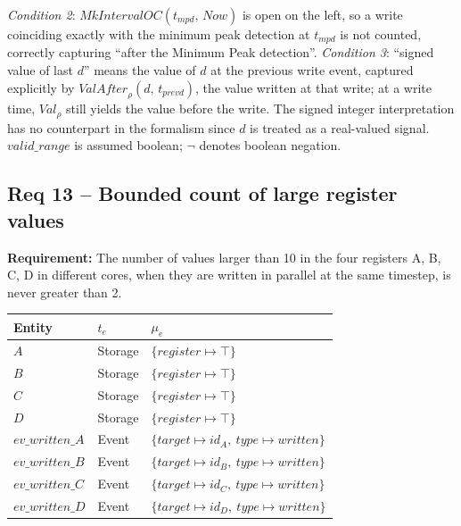 \textit{Condition 2}: $\mathit{MkIntervalOC}(t_{\mathit{mpd}},\, \mathit{Now})$ is open on the left, so a write coinciding exactly with the minimum peak detection at $t_{\mathit{mpd}}$ is not counted, correctly capturing ``after the Minimum Peak detection''.
\textit{Condition 3}: ``signed value of last $d$'' means the value of $d$ at the previous write event, captured explicitly by $\mathit{ValAfter}_\rho(d,\, t_{\mathit{prevd}})$, the value written at that write; at a write time, $\mathit{Val}_\rho$ still yields the value before the write. The signed integer interpretation has no counterpart in the formalism since $d$ is treated as a real-valued signal.
$\mathit{valid\_range}$ is assumed boolean; $\lnot$ denotes boolean negation.

\subsection{Req 13 -- Bounded count of large register values}

\textbf{Requirement:} The number of values larger than 10 in the four registers A, B, C, D in different cores, when they are written in parallel at the same timestep, is never greater than 2.

\medskip
\begin{center}
\begin{tabular}{lll}
    \toprule
    \textbf{Entity} & $t_e$ & $\mu_e$ \\
    \midrule
    $A$ & Storage & $\{\mathit{register} \mapsto \top\}$ \\
    $B$ & Storage & $\{\mathit{register} \mapsto \top\}$ \\
    $C$ & Storage & $\{\mathit{register} \mapsto \top\}$ \\
    $D$ & Storage & $\{\mathit{register} \mapsto \top\}$ \\
    $\mathit{ev\_written\_A}$ & Event & $\{\mathit{target} \mapsto id_A,\ \mathit{type} \mapsto \mathit{written}\}$ \\
    $\mathit{ev\_written\_B}$ & Event & $\{\mathit{target} \mapsto id_B,\ \mathit{type} \mapsto \mathit{written}\}$ \\
    $\mathit{ev\_written\_C}$ & Event & $\{\mathit{target} \mapsto id_C,\ \mathit{type} \mapsto \mathit{written}\}$ \\
    $\mathit{ev\_written\_D}$ & Event & $\{\mathit{target} \mapsto id_D,\ \mathit{type} \mapsto \mathit{written}\}$ \\
    \bottomrule
\end{tabular}
\end{center}

